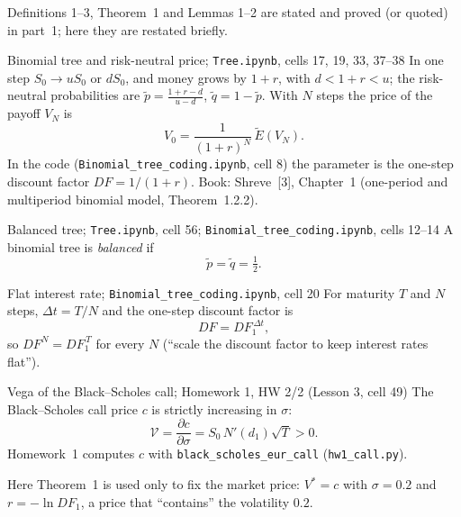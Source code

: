 \documentclass[11pt,a4paper]{article}
\newcommand{\subhead}[1]{\par\medskip\noindent{\large\bfseries #1}\par\smallskip\noindent\ignorespaces}
\newcommand{\Et}{\tilde{E}}
\begin{document}
\subhead{Results used.}
Definitions 1--3, Theorem~1 and Lemmas 1--2 are stated and proved (or quoted) in part~1; here they are restated briefly.

\begin{defbox}{Binomial tree and risk-neutral price; \texttt{Tree.ipynb}, cells 17, 19, 33, 37--38}
In one step $S_0\to uS_0$ or $dS_0$, and money grows by $1+r$, with $d<1+r<u$; the risk-neutral probabilities are $\tilde p=\frac{1+r-d}{u-d}$, $\tilde q=1-\tilde p$. With $N$ steps the price of the payoff $V_N$ is
\begin{equation}\label{eq:VN}
V_0=\frac{1}{(1+r)^N}\,\Et(V_N).
\end{equation}
In the code (\texttt{Binomial\_tree\_coding.ipynb}, cell 8) the parameter is the one-step discount factor $DF=1/(1+r)$. Book: Shreve~[3], Chapter~1 (one-period and multiperiod binomial model, Theorem~1.2.2).
\end{defbox}

\begin{defbox}{Balanced tree; \texttt{Tree.ipynb}, cell 56; \texttt{Binomial\_tree\_coding.ipynb}, cells 12--14}
A binomial tree is \emph{balanced} if
\begin{equation}\label{eq:bal}
\tilde p=\tilde q=\tfrac12 .
\end{equation}
\end{defbox}

\begin{defbox}{Flat interest rate; \texttt{Binomial\_tree\_coding.ipynb}, cell 20}
For maturity $T$ and $N$ steps, $\Delta t=T/N$ and the one-step discount factor is
\begin{equation}\label{eq:flat}
DF=DF_1^{\,\Delta t},
\end{equation}
so $DF^N=DF_1^{\,T}$ for every $N$ (``scale the discount factor to keep interest rates flat'').
\end{defbox}

\begin{thmbox}{Vega of the Black--Scholes call; Homework 1, HW 2/2 (Lesson 3, cell 49)}
The Black--Scholes call price $c$ is strictly increasing in $\sigma$:
\begin{equation}\label{eq:vega}
\mathcal V=\frac{\partial c}{\partial\sigma}=S_0\,N'(d_1)\sqrt T>0 .
\end{equation}
Homework~1 computes $c$ with \texttt{black\_scholes\_eur\_call} (\texttt{hw1\_call.py}).
\end{thmbox}
\noindent Here Theorem~1 is used only to fix the market price: $V^*=c$ with $\sigma=0.2$ and $r=-\ln DF_1$, a price that ``contains'' the volatility $0.2$.
\end{document}
